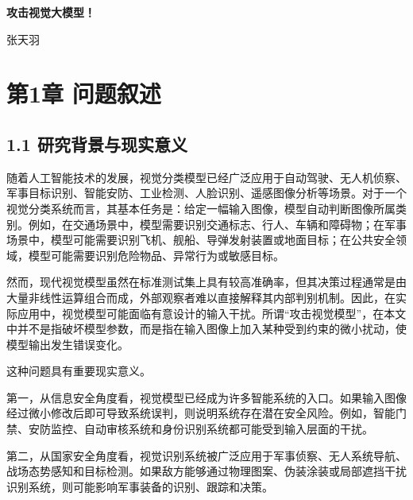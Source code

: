 ﻿\documentclass[UTF8,zihao=-4,fontset=none]{ctexart}
\newcommand{\studentname}{张天羽}
\newcommand{\quiztitle}{攻击视觉大模型！}
\begin{document}

\thispagestyle{coverstyle}
\begin{center}
  \vspace*{1.1cm}
  {\bfseries \quiztitle\par}
  \vspace{0.7cm}
  {\studentname\par}
\end{center}
\vspace{0.4cm}
\tableofcontents

\clearpage
\pagestyle{mainstyle}

\section*{第1章 问题叙述}
{}

\subsection*{1.1 研究背景与现实意义}
{}

随着人工智能技术的发展，视觉分类模型已经广泛应用于自动驾驶、无人机侦察、军事目标识别、智能安防、工业检测、人脸识别、遥感图像分析等场景。对于一个视觉分类系统而言，其基本任务是：给定一幅输入图像，模型自动判断图像所属类别。例如，在交通场景中，模型需要识别交通标志、行人、车辆和障碍物；在军事场景中，模型可能需要识别飞机、舰船、导弹发射装置或地面目标；在公共安全领域，模型可能需要识别危险物品、异常行为或敏感目标。

然而，现代视觉模型虽然在标准测试集上具有较高准确率，但其决策过程通常是由大量非线性运算组合而成，外部观察者难以直接解释其内部判别机制。因此，在实际应用中，视觉模型可能面临有意设计的输入干扰。所谓“攻击视觉模型”，在本文中并不是指破坏模型参数，而是指在输入图像上加入某种受到约束的微小扰动，使模型输出发生错误变化。

这种问题具有重要现实意义。

第一，从信息安全角度看，视觉模型已经成为许多智能系统的入口。如果输入图像经过微小修改后即可导致系统误判，则说明系统存在潜在安全风险。例如，智能门禁、安防监控、自动审核系统和身份识别系统都可能受到输入层面的干扰。

第二，从国家安全角度看，视觉识别系统被广泛应用于军事侦察、无人系统导航、战场态势感知和目标检测。如果敌方能够通过物理图案、伪装涂装或局部遮挡干扰识别系统，则可能影响军事装备的识别、跟踪和决策。
\end{document}
